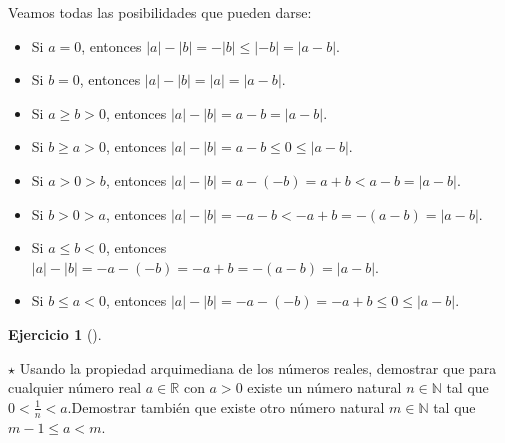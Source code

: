 \documentclass[
  a4paper,
]{scrreport}
\providecommand{\tightlist}{%
  \setlength{\itemsep}{0pt}\setlength{\parskip}{0pt}}\usepackage{longtable,booktabs,array}
\theoremstyle{definition}
\newtheorem{exercise}{Ejercicio}[chapter]
\theoremstyle{remark}
\begin{document}
\begin{tcolorbox}[enhanced jigsaw, left=2mm, coltitle=black, colbacktitle=quarto-callout-tip-color!10!white, opacitybacktitle=0.6, colback=white, breakable, titlerule=0mm, toptitle=1mm, rightrule=.15mm, bottomtitle=1mm, bottomrule=.15mm, toprule=.15mm, leftrule=.75mm, arc=.35mm, opacityback=0, title=\textcolor{quarto-callout-tip-color}{\faLightbulb}\hspace{0.5em}{Solución}, colframe=quarto-callout-tip-color-frame]

Veamos todas las posibilidades que pueden darse:

\begin{itemize}
\tightlist
\item
  Si \(a=0\), entonces \(|a|-|b|= -|b|\leq |-b| = |a-b|\).
\item
  Si \(b=0\), entonces \(|a|-|b|=|a|= |a-b|\).
\item
  Si \(a\geq b>0\), entonces \(|a|-|b|=a-b=|a-b|\).
\item
  Si \(b\geq a>0\), entonces \(|a|-|b|=a-b\leq 0\leq |a-b|\).
\item
  Si \(a>0>b\), entonces \(|a|-|b| = a-(-b) =a+b < a-b =|a-b|\).
\item
  Si \(b>0>a\), entonces \(|a|-|b| = -a-b < -a+b = -(a-b) = |a-b|\).
\item
  Si \(a\leq b<0\), entonces
  \(|a|-|b| = -a-(-b) = -a+b = -(a-b) = |a-b|\).
\item
  Si \(b\leq a<0\), entonces
  \(|a|-|b| = -a-(-b) = -a+b \leq 0 \leq |a-b|\).
\end{itemize}

\end{tcolorbox}

\begin{exercise}[]\protect\hypertarget{exr-propiedad-arquimediana-1}{}\label{exr-propiedad-arquimediana-1}

\(\star\) Usando la propiedad arquimediana de los números reales,
demostrar que para cualquier número real \(a\in\mathbb{R}\) con \(a>0\)
existe un número natural \(n\in \mathbb{N}\) tal que
\(0<\frac{1}{n}<a\).Demostrar también que existe otro número natural
\(m\in \mathbb{N}\) tal que \(m-1\leq a< m\).

\end{exercise}
\end{document}
